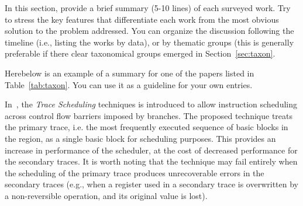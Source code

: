 In this section, provide a brief summary (5-10 lines) of each surveyed work. 
Try to stress the key features that differentiate each work from the most obvious solution to the problem addressed.
You can organize the discussion following the timeline (i.e., listing the works by data), or by thematic groups (this is generally preferable if there clear taxonomical groups emerged in Section~\ref{sec:taxon}.

Herebelow is an example of a summary for one of the papers listed in Table~\ref{tab:taxon}.
You can use it as a guideline for your own entries.

In~\cite{Fisher:1981:TST:1311075.1311325}, the \emph{Trace Scheduling} techniques is introduced to allow instruction scheduling across control flow barriers imposed by branches.
The proposed technique treats the primary trace, i.e. the most frequently executed sequence of basic blocks in the region, as a single basic block for scheduling purposes.   
This provides an increase in performance of the scheduler, at the cost of decreased performance for the secondary traces.
It is worth noting that the technique may fail entirely when the scheduling of the primary trace produces unrecoverable errors in the secondary traces (e.g., when a register used in a secondary trace is overwritten by a non-reversible operation, and its original value is lost).
